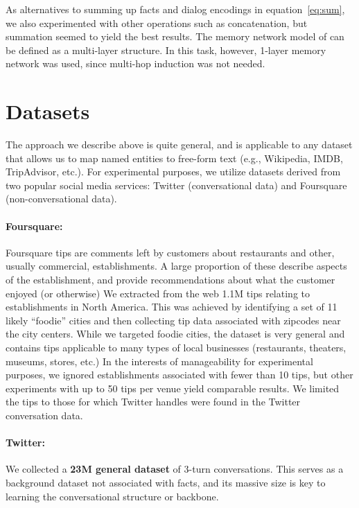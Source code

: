 \documentclass[letterpaper]{article}
\begin{document}
As alternatives to summing up facts and dialog encodings in equation~\ref{eq:sum}, we also experimented with other operations such as concatenation, but summation seemed to yield the best results.
The memory network model of \cite{weston2014} can be defined as a multi-layer structure. 
In this task, however, 1-layer memory network was used, since multi-hop induction was not needed.

\section{Datasets}

The approach we describe above is quite general, and is applicable to any dataset that allows us to map named
entities to free-form text (e.g., Wikipedia, IMDB, TripAdvisor, etc.).
For experimental purposes, we utilize datasets derived from two popular social media services: 
Twitter
 (conversational data) and 
Foursquare
 (non-conversational data).

\paragraph{Foursquare:}
Foursquare tips are comments left by customers about restaurants and other, usually commercial, establishments. 
A large proportion of these describe aspects of the establishment, and provide recommendations about what the customer enjoyed (or otherwise)
We extracted from the web 1.1M tips relating to establishments in North America. 
This was achieved by identifying a set of 11 likely ``foodie'' cities and then collecting tip data associated with zipcodes near the city centers. 
While we targeted foodie cities, the dataset is very general and contains tips applicable to many types of local businesses (restaurants, theaters, museums, stores, etc.) 
In the interests of manageability for experimental purposes, we ignored establishments associated with fewer than 10 tips, but other experiments with up to 50 tips per venue yield comparable results.
We limited the tips to those for which Twitter handles were found in the Twitter conversation data.

\paragraph{Twitter:}
We collected a {\bf 23M general dataset}
of \mbox{3-turn} conversations.
This serves as a background dataset not associated with facts, and its massive size is key to learning the conversational structure or backbone.
\end{document}
